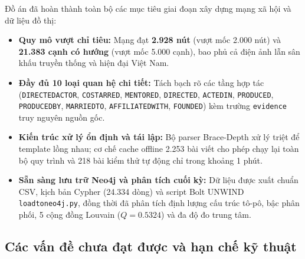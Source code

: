 \documentclass[12pt,a4paper]{article}
\renewcommand{\_}{\oldunderscore\hspace{0pt}}
\begin{document}
Đồ án đã hoàn thành toàn bộ các mục tiêu giai đoạn xây dựng mạng xã hội và dữ liệu đồ thị:
\begin{itemize}
  \item \textbf{Quy mô vượt chỉ tiêu:} Mạng đạt \textbf{2.928 nút} (vượt mốc 2.000 nút) và \textbf{21.383 cạnh có hướng} (vượt mốc 5.000 cạnh), bao phủ cả điện ảnh lẫn sân khấu truyền thống và hiện đại Việt Nam.
  \item \textbf{Đầy đủ 10 loại quan hệ chi tiết:} Tách bạch rõ các tầng hợp tác (\texttt{DIRECTED\_ACTOR}, \texttt{CO\_STARRED}, \texttt{MENTORED}, \texttt{DIRECTED}, \texttt{ACTED\_IN}, \texttt{PRODUCED}, \texttt{PRODUCED\_BY}, \texttt{MARRIED\_TO}, \texttt{AFFILIATED\_WITH}, \texttt{FOUNDED}) kèm trường \texttt{evidence} truy nguyên nguồn gốc.
  \item \textbf{Kiến trúc xử lý ổn định và tái lập:} Bộ parser Brace-Depth xử lý triệt để template lồng nhau; cơ chế cache offline 2.253 bài viết cho phép chạy lại toàn bộ quy trình và 218 bài kiểm thử tự động chỉ trong khoảng 1 phút.
  \item \textbf{Sẵn sàng lưu trữ Neo4j và phân tích cuối kỳ:} Dữ liệu được xuất chuẩn CSV, kịch bản Cypher (24.334 dòng) và script Bolt UNWIND \texttt{load\_to\_neo4j.py}, đồng thời đã phân tích định lượng cấu trúc tô-pô, bậc phân phối, 5 cộng đồng Louvain ($Q = 0.5324$) và đa độ đo trung tâm.
\end{itemize}

\subsection{Các vấn đề chưa đạt được và hạn chế kỹ thuật}
\end{document}
